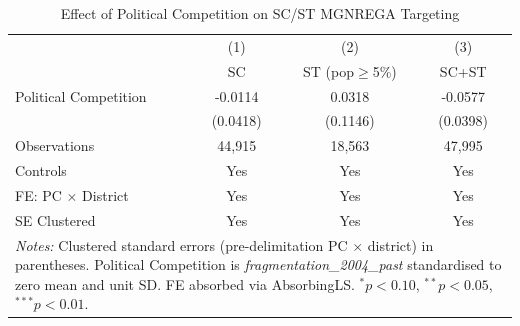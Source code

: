 \begin{table}[htbp]
\centering
\caption{Effect of Political Competition on SC/ST MGNREGA Targeting}
\label{tab:main_results}
\begin{tabular}{lccc}
\hline\hline
 & (1) & (2) & (3) \\
 & SC & ST (pop$\geq$5\%) & SC+ST \\
\hline
Political Competition & -0.0114 & 0.0318 & -0.0577 \\
 & (0.0418) & (0.1146) & (0.0398) \\
\hline
Observations & 44,915 & 18,563 & 47,995 \\
Controls & Yes & Yes & Yes \\
FE: PC $\times$ District & Yes & Yes & Yes \\
SE Clustered & Yes & Yes & Yes \\
\hline\hline
\multicolumn{4}{p{11.0cm}}{\footnotesize \textit{Notes:} Clustered standard errors (pre-delimitation PC $\times$ district) in parentheses. Political Competition is \textit{fragmentation\_2004\_past} standardised to zero mean and unit SD. FE absorbed via AbsorbingLS. $^{*}p<0.10$, $^{**}p<0.05$, $^{***}p<0.01$.}
\end{tabular}
\end{table}